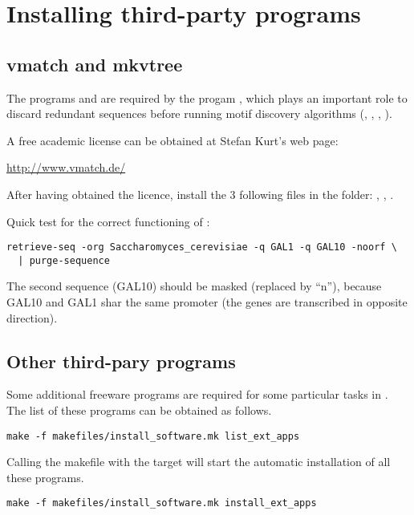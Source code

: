 \documentclass[12pt,a4paper, oneside]{scrreprt} %
\begin{document}
\section{Installing third-party programs}

\subsection{vmatch and mkvtree}

The programs  and  are required by
the \RSAT progam , which plays an important
role to discard redundant sequences before running motif discovery
algorithms (, ,
, ).

A free academic license can be obtained at Stefan Kurt's web page:

\url{http://www.vmatch.de/}

After having obtained the licence, install the 3 following files in
the  folder: , ,
.

Quick test for the correct functioning of :

\begin{lstlisting}
retrieve-seq -org Saccharomyces_cerevisiae -q GAL1 -q GAL10 -noorf \
  | purge-sequence
\end{lstlisting}

The second sequence (GAL10) should be masked (replaced by ``n''),
because GAL10 and GAL1 shar the same promoter (the genes are
transcribed in opposite direction).

\subsection{Other third-pary programs}

Some additional freeware programs are required for some particular
tasks in \RSAT. The list of these programs can be obtained as follows.

\begin{lstlisting}
make -f makefiles/install_software.mk list_ext_apps
\end{lstlisting}

Calling the makefile with the target  will
start the automatic installation of all these programs. 

\begin{lstlisting}
make -f makefiles/install_software.mk install_ext_apps
\end{lstlisting}
\end{document}
